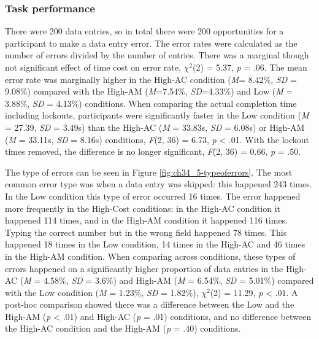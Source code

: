 \subsubsection{Task performance}
There were 200 data entries, so in total there were 200 opportunities for a participant to make a data entry error. The error rates were calculated as the number of errors divided by the number of entries. 
There was a marginal though not significant effect of time cost on error rate, $\chi^2$(2) = 5.37, \textit{p} = .06. The mean error rate was marginally higher in the High-AC condition (\textit{M}= 8.42\%, \textit{SD} = 9.08\%) compared with the High-AM (\textit{M}=7.54\%, \textit{SD}=4.33\%) and Low (\textit{M} = 3.88\%, \textit{SD} = 4.13\%) conditions. When comparing the actual completion time including lockouts, participants were significantly faster in the Low condition (\textit{M} = 27.39, \textit{SD} = 3.49s) than the High-AC (\textit{M} = 33.83s, \textit{SD} = 6.08s) or High-AM (\textit{M} = 33.11s, \textit{SD} = 8.16s) conditions, \textit{F}(2, 36) = 6.73, \textit{p} < .01. With the lockout times removed, the difference is no longer significant, \textit{F}(2, 36) = 0.66, \textit{p} = .50.


The type of errors can be seen in Figure \ref{fig:ch34_5-typeoferrors}. The most common error type was when a data entry was skipped: this happened 243 times. %
In the Low condition this type of error occurred 16 times. The error happened more frequently in the High-Cost conditions: in the High-AC condition it happened 114 times, and in the High-AM condition it happened 116 times.
Typing the correct number but in the wrong field happened 78 times. This happened 18 times in the Low condition, 14 times in the High-AC and 46 times in the High-AM condition.
When comparing across conditions, these types of errors happened on a significantly higher proportion of data entries in the High-AC (\textit{M} = 4.58\%, \textit{SD} = 3.6\%) and High-AM (\textit{M} = 6.54\%, \textit{SD} = 5.01\%) compared with the Low condition (\textit{M} = 1.23\%, \textit{SD} = 1.82\%),  $\chi^2$(2) = 11.29, \textit{p} < .01.  A post-hoc comparison showed there was a difference between the Low and the High-AM (\textit{p} < .01) and High-AC (\textit{p} = .01) conditions, and no difference between the High-AC condition and the High-AM (\textit{p} = .40) conditions.

